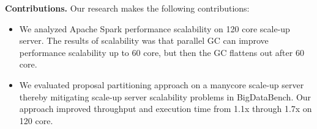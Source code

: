 
\textbf{Contributions.} Our research makes the following contributions:
\begin{itemize}
\item 
We analyzed Apache Spark performance scalability on 120 core scale-up server.
The results of scalability was that parallel GC can improve performance
scalability up to 60 core, but then the GC flattens out after 60 core.
\item 
We evaluated proposal partitioning approach on a manycore scale-up
server thereby mitigating scale-up server scalability problems in BigDataBench.
Our approach improved throughput and execution time from 1.1x through
1.7x on 120 core.
\end{itemize}


